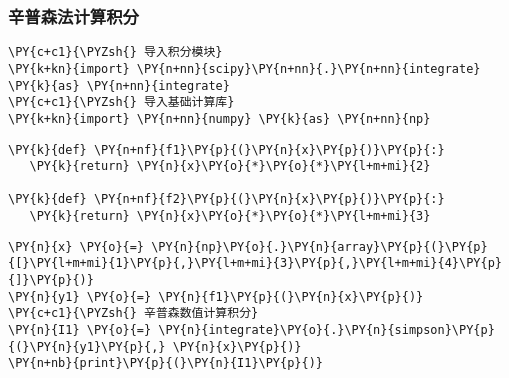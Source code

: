     \hypertarget{ux8f9bux666eux68eeux6cd5ux8ba1ux7b97ux79efux5206}{%
\subsubsection{辛普森法计算积分}\label{ux8f9bux666eux68eeux6cd5ux8ba1ux7b97ux79efux5206}}

    \begin{tcolorbox}[breakable, size=fbox, boxrule=1pt, pad at break*=1mm,colback=cellbackground, colframe=cellborder]
\begin{Verbatim}[commandchars=\\\{\}]
\PY{c+c1}{\PYZsh{} 导入积分模块}
\PY{k+kn}{import} \PY{n+nn}{scipy}\PY{n+nn}{.}\PY{n+nn}{integrate} \PY{k}{as} \PY{n+nn}{integrate}
\PY{c+c1}{\PYZsh{} 导入基础计算库}
\PY{k+kn}{import} \PY{n+nn}{numpy} \PY{k}{as} \PY{n+nn}{np}
\end{Verbatim}
\end{tcolorbox}

    \begin{tcolorbox}[breakable, size=fbox, boxrule=1pt, pad at break*=1mm,colback=cellbackground, colframe=cellborder]
\begin{Verbatim}[commandchars=\\\{\}]
\PY{k}{def} \PY{n+nf}{f1}\PY{p}{(}\PY{n}{x}\PY{p}{)}\PY{p}{:}
   \PY{k}{return} \PY{n}{x}\PY{o}{*}\PY{o}{*}\PY{l+m+mi}{2}

\PY{k}{def} \PY{n+nf}{f2}\PY{p}{(}\PY{n}{x}\PY{p}{)}\PY{p}{:}
   \PY{k}{return} \PY{n}{x}\PY{o}{*}\PY{o}{*}\PY{l+m+mi}{3}
\end{Verbatim}
\end{tcolorbox}

    \begin{tcolorbox}[breakable, size=fbox, boxrule=1pt, pad at break*=1mm,colback=cellbackground, colframe=cellborder]
\begin{Verbatim}[commandchars=\\\{\}]
\PY{n}{x} \PY{o}{=} \PY{n}{np}\PY{o}{.}\PY{n}{array}\PY{p}{(}\PY{p}{[}\PY{l+m+mi}{1}\PY{p}{,}\PY{l+m+mi}{3}\PY{p}{,}\PY{l+m+mi}{4}\PY{p}{]}\PY{p}{)}
\PY{n}{y1} \PY{o}{=} \PY{n}{f1}\PY{p}{(}\PY{n}{x}\PY{p}{)}
\PY{c+c1}{\PYZsh{} 辛普森数值计算积分}
\PY{n}{I1} \PY{o}{=} \PY{n}{integrate}\PY{o}{.}\PY{n}{simpson}\PY{p}{(}\PY{n}{y1}\PY{p}{,} \PY{n}{x}\PY{p}{)}
\PY{n+nb}{print}\PY{p}{(}\PY{n}{I1}\PY{p}{)}
\end{Verbatim}
\end{tcolorbox}

